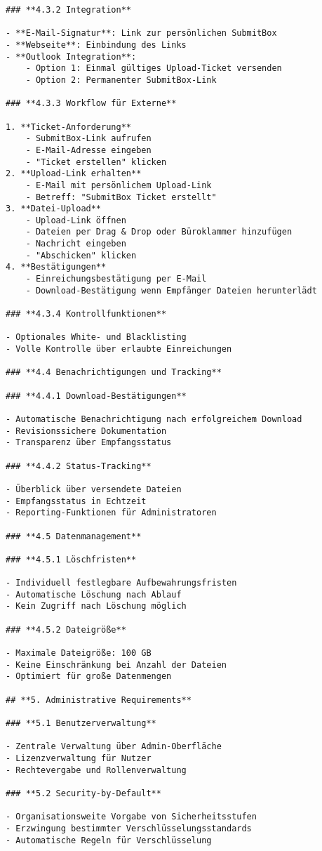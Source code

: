 \begin{verbatim}
### **4.3.2 Integration**

- **E-Mail-Signatur**: Link zur persönlichen SubmitBox
- **Webseite**: Einbindung des Links
- **Outlook Integration**:
    - Option 1: Einmal gültiges Upload-Ticket versenden
    - Option 2: Permanenter SubmitBox-Link

### **4.3.3 Workflow für Externe**

1. **Ticket-Anforderung**
    - SubmitBox-Link aufrufen
    - E-Mail-Adresse eingeben
    - "Ticket erstellen" klicken
2. **Upload-Link erhalten**
    - E-Mail mit persönlichem Upload-Link
    - Betreff: "SubmitBox Ticket erstellt"
3. **Datei-Upload**
    - Upload-Link öffnen
    - Dateien per Drag & Drop oder Büroklammer hinzufügen
    - Nachricht eingeben
    - "Abschicken" klicken
4. **Bestätigungen**
    - Einreichungsbestätigung per E-Mail
    - Download-Bestätigung wenn Empfänger Dateien herunterlädt

### **4.3.4 Kontrollfunktionen**

- Optionales White- und Blacklisting
- Volle Kontrolle über erlaubte Einreichungen

### **4.4 Benachrichtigungen und Tracking**

### **4.4.1 Download-Bestätigungen**

- Automatische Benachrichtigung nach erfolgreichem Download
- Revisionssichere Dokumentation
- Transparenz über Empfangsstatus

### **4.4.2 Status-Tracking**

- Überblick über versendete Dateien
- Empfangsstatus in Echtzeit
- Reporting-Funktionen für Administratoren

### **4.5 Datenmanagement**

### **4.5.1 Löschfristen**

- Individuell festlegbare Aufbewahrungsfristen
- Automatische Löschung nach Ablauf
- Kein Zugriff nach Löschung möglich

### **4.5.2 Dateigröße**

- Maximale Dateigröße: 100 GB
- Keine Einschränkung bei Anzahl der Dateien
- Optimiert für große Datenmengen

## **5. Administrative Requirements**

### **5.1 Benutzerverwaltung**

- Zentrale Verwaltung über Admin-Oberfläche
- Lizenzverwaltung für Nutzer
- Rechtevergabe und Rollenverwaltung

### **5.2 Security-by-Default**

- Organisationsweite Vorgabe von Sicherheitsstufen
- Erzwingung bestimmter Verschlüsselungsstandards
- Automatische Regeln für Verschlüsselung


\end{verbatim}
